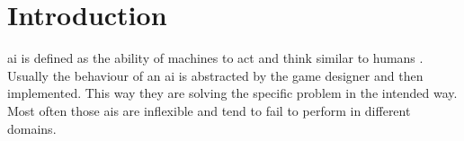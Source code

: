 \section{Introduction}

\bigskip

\ac{ai} is defined as the ability of machines to act and think similar to humans . Usually the behaviour of an \ac{ai} is abstracted by the game designer and then implemented. This way they are solving the specific problem in the intended way. Most often those \acp{ai} are inflexible and tend to fail to perform in different domains.